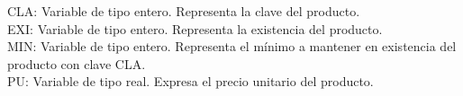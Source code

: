 \documentclass[11pt]{amsart}
\begin{document}
\noindent CLA: Variable de tipo entero. Representa la clave del producto.\\

\noindent EXI: Variable de tipo entero. Representa la existencia del producto.\\

\noindent MIN: Variable de tipo entero. Representa el mínimo a mantener en existencia del producto con clave CLA.\\

\noindent PU: Variable de tipo real. Expresa el precio unitario del producto.\\
\end{document}
